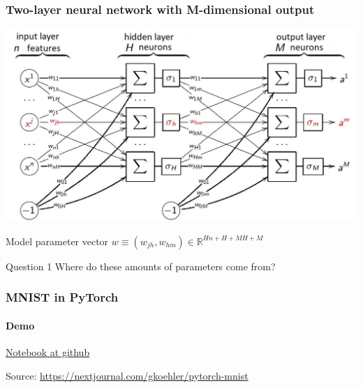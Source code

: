 \documentclass[fullscreen=true, bookmarks=true, hyperref={pdfencoding=unicode}]{beamer}
\begin{document}
\begin{frame}
  \frametitle{Two-layer neural network with M-dimensional output}

  \begin{center}
    \includegraphics[keepaspectratio,                     height=0.6\paperheight]{nn_two_layers.jpg}
  \end{center}
  
  Model parameter vector $w \equiv (w_{jh}, w_{hm}) \in \mathbb{R}^{Hn + H + MH + M}$
\end{frame}


\begin{frame}
    \begin{block}{Question 1}
    Where do these amounts of parameters come from?
    \end{block}
\end{frame}


\begin{frame}
  \frametitle{MNIST in PyTorch}
  \framesubtitle{Demo}
  
  \href{https://github.com/avalur/ml-course-kbtu/tree/main/week05_nn_backprop/demo_MNIST_in_PyTorch.ipynb}{Notebook at github}

  \vspace{1.5cm}

  Source: \href{https://nextjournal.com/gkoehler/pytorch-mnist}{https://nextjournal.com/gkoehler/pytorch-mnist}
  
\end{frame}
\end{document}
